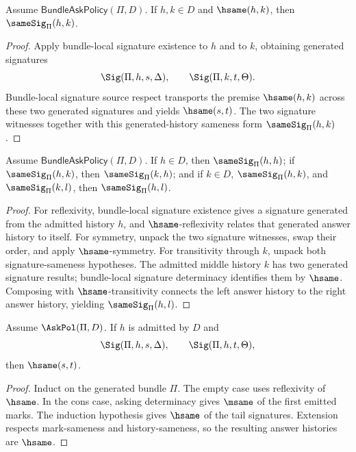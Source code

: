 \begin{theorem}
\label{thm:bundle-local-samesig-of-hsame}
Assume $\mathsf{BundleAskPolicy}(\Pi,D)$. If $h,k\in D$ and $\hsame(h,k)$, then $\sameSig_\Pi(h,k)$.
\end{theorem}
\begin{proof}
Apply bundle-local signature existence to $h$ and to $k$, obtaining generated signatures
$$
\Sig(\Pi,h,s,\Delta),
\qquad
\Sig(\Pi,k,t,\Theta).
$$
Bundle-local signature source respect transports the premise $\hsame(h,k)$ across these two generated signatures and yields $\hsame(s,t)$. The two signature witnesses together with this generated-history sameness form $\sameSig_\Pi(h,k)$.
\end{proof}

\begin{theorem}
\label{thm:bundle-local-signature-sameness-equivalence}
Assume $\mathsf{BundleAskPolicy}(\Pi,D)$. If $h\in D$, then
$\sameSig_\Pi(h,h)$; if $\sameSig_\Pi(h,k)$, then $\sameSig_\Pi(k,h)$;
and if $k\in D$, $\sameSig_\Pi(h,k)$, and $\sameSig_\Pi(k,l)$, then
$\sameSig_\Pi(h,l)$.
\end{theorem}
\begin{proof}
For reflexivity, bundle-local signature existence gives a signature generated
from the admitted history $h$, and $\hsame$-reflexivity relates that generated
answer history to itself. For symmetry, unpack the two signature witnesses,
swap their order, and apply $\hsame$-symmetry. For transitivity through $k$,
unpack both signature-sameness hypotheses. The admitted middle history $k$
has two generated signature results; bundle-local signature determinacy
identifies them by $\hsame$. Composing with $\hsame$-transitivity connects the
left answer history to the right answer history, yielding $\sameSig_\Pi(h,l)$.
\end{proof}

\begin{theorem}
\label{thm:signature-determinacy-under-asking-policy}
Assume $\AskPol(\Pi,D)$. If $h$ is admitted by $D$ and
$$
\Sig(\Pi,h,s,\Delta),
\qquad
\Sig(\Pi,h,t,\Theta),
$$
then $\hsame(s,t)$.
\end{theorem}
\begin{proof}
Induct on the generated bundle $\Pi$. The empty case uses reflexivity of $\hsame$. In the cons case, asking determinacy gives $\msame$ of the first emitted marks. The induction hypothesis gives $\hsame$ of the tail signatures. Extension respects mark-sameness and history-sameness, so the resulting answer histories are $\hsame$.
\end{proof}

